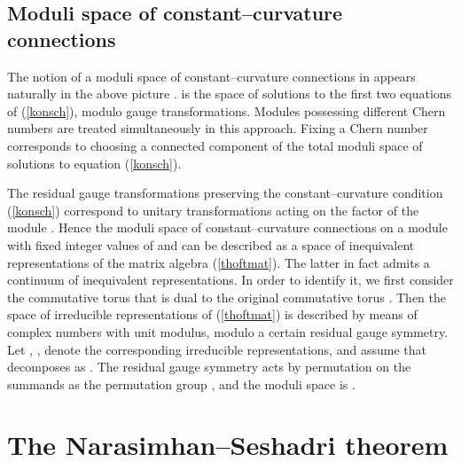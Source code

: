 \documentclass[a4paper,a4paper]{article}
\begin{document}
\subsection{Moduli space of constant--curvature connections}\label{modspace}  
  
The notion of a moduli space \coordHE{} of constant--curvature 
connections in \coordHE{} appears naturally in the above picture \cite{KONECHNYSCHWARZ}. 
\coordHE{} is the space of solutions to the first two equations 
of (\ref{konsch}), modulo gauge transformations. Modules possessing different 
Chern numbers are treated simultaneously in this approach. Fixing a Chern number 
corresponds to choosing a connected component of the total moduli space of solutions 
to equation (\ref{konsch}).  
  
The residual gauge transformations preserving the constant--curvature condition  
(\ref{konsch}) correspond to \coordHE{} unitary transformations acting on the  
\coordHE{} factor of the  module \coordHE{}. Hence the moduli space of  
constant--curvature connections on a module with fixed integer values of \coordHE{}  
and \coordHE{} can be described as a space of inequivalent representations of  
the matrix algebra (\ref{thoftmat}). The latter in fact admits a continuum of  
inequivalent representations. In order to identify it, we first consider the  
commutative torus \coordHE{} that is dual to the original commutative torus 
\coordHE{}. Then the space of irreducible representations 
of (\ref{thoftmat}) is  described by means of \coordHE{} complex numbers \coordHE{} 
with unit modulus, modulo a certain residual gauge symmetry. Let \coordHE{}, 
\coordHE{}, denote the corresponding irreducible 
representations, and assume that \coordHE{} decomposes  
as \coordHE{}. The residual gauge  
symmetry acts by permutation on the \coordHE{} summands as the permutation group  
\coordHE{}, and the moduli space \coordHE{} is \coordHE{}.  

\section{The Narasimhan--Seshadri theorem}\label{nstheorema} 
  
\end{document}
